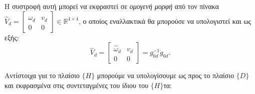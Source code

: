 \documentclass[12pt]{article} %
\numberwithin{equation}{section}  %
\begin{document}
Η συστροφή αυτή μπορεί να εκφραστεί σε \textit{ομογενή μορφή} από τον πίνακα 
$\widehat{V}_d = \begin{bmatrix} 
\widehat{\omega}_d & v_d \\ 
0 & 0
\end{bmatrix} \in \mathbb{R}^{4 \times 4}$, 
ο οποίος εναλλακτικά θα μπορούσε να υπολογιστεί και ως εξής:
\begin{equation}\label{eq:Vhatd}
    \widehat{V}_d = \begin{bmatrix} 
\widehat{\omega}_d & v_d \\ 
0 & 0
\end{bmatrix} = 
g_{0d}^{-1} \dot{g}_{0d}.
\end{equation}

Αντίστοιχα για το πλαίσιο $\{H\}$ μπορούμε να υπολογίσουμε\textemdash 
ως προς το πλαίσιο $\{D\}$ και εκφρασμένα στις συντεταγμένες του ίδιου του $\{H\}$\textemdash τα:
\end{document}
